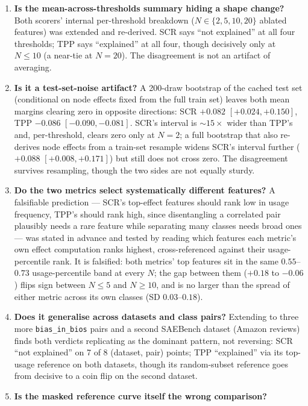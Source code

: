\documentclass[11pt]{article}
\begin{document}
\begin{enumerate}
\item \textbf{Is the mean-across-thresholds summary hiding a shape change?}
  Both scorers' internal per-threshold breakdown ($N\in\{2,5,10,20\}$
  ablated features) was extended and re-derived. SCR says ``not explained''
  at all four thresholds; TPP says ``explained'' at all four, though
  decisively only at $N\le10$ (a near-tie at $N=20$). The disagreement is not
  an artifact of averaging.
\item \textbf{Is it a test-set-noise artifact?} A 200-draw bootstrap of the
  cached test set (conditional on node effects fixed from the full train
  set) leaves both mean margins clearing zero in opposite directions: SCR
  $+0.082$ $[+0.024,+0.150]$, TPP $-0.086$ $[-0.090,-0.081]$. SCR's interval
  is $\sim15\times$ wider than TPP's and, per-threshold, clears zero only at
  $N=2$; a full bootstrap that also re-derives node effects from a
  train-set resample widens SCR's interval further ($+0.088$
  $[+0.008,+0.171]$) but still does not cross zero. The disagreement
  survives resampling, though the two sides are not equally sturdy.
\item \textbf{Do the two metrics select systematically different features?}
  A falsifiable prediction --- SCR's top-effect features should rank low in
  usage frequency, TPP's should rank high, since disentangling a correlated
  pair plausibly needs a rare feature while separating many classes needs
  broad ones --- was stated in advance and tested by reading which features
  each metric's own effect computation ranks highest, cross-referenced
  against their usage-percentile rank. It is falsified: both metrics' top
  features sit in the same $0.55$--$0.73$ usage-percentile band at every
  $N$; the gap between them ($+0.18$ to $-0.06$) flips sign between $N\le5$
  and $N\ge10$, and is no larger than the spread of either metric across its
  own classes (SD $0.03$--$0.18$).
\item \textbf{Does it generalise across datasets and class pairs?} Extending
  to three more \texttt{bias\_in\_bios} pairs and a second SAEBench dataset
  (Amazon reviews) finds both verdicts replicating as the dominant pattern,
  not reversing: SCR ``not explained'' on 7 of 8 (dataset, pair) points; TPP
  ``explained'' via its top-usage reference on both datasets, though its
  random-subset reference goes from decisive to a coin flip on the second
  dataset.
\item \textbf{Is the masked reference curve itself the wrong comparison?}

\end{enumerate}
\end{document}
